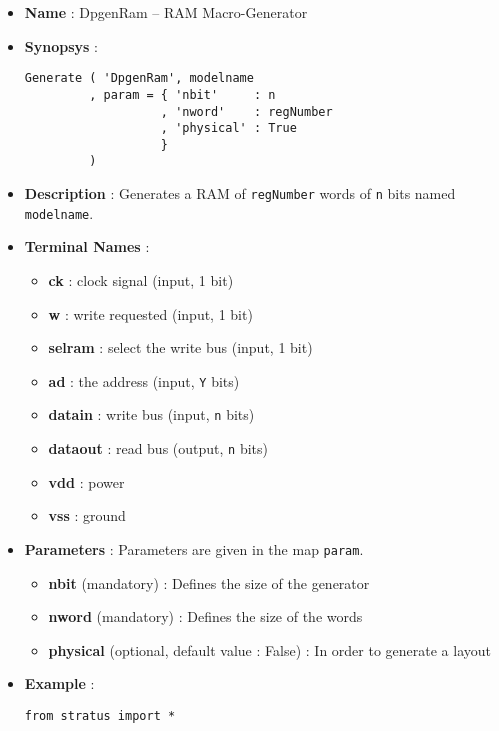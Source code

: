 \begin{itemize}
    \item \textbf{Name} : DpgenRam -- RAM Macro-Generator
    \item \textbf{Synopsys} :
\begin{verbatim}
Generate ( 'DpgenRam', modelname
         , param = { 'nbit'     : n
                   , 'nword'    : regNumber
                   , 'physical' : True                   
                   }
         )
\end{verbatim}
    \item \textbf{Description} : Generates a RAM of \verb-regNumber- words of \verb-n- bits named \verb-modelname-.
    \item \textbf{Terminal Names} :
    \begin{itemize}
        \item \textbf{ck} : clock signal (input, 1 bit)
        \item \textbf{w} : write requested (input, 1 bit)
        \item \textbf{selram} : select the write bus (input, 1 bit)
        \item \textbf{ad} : the address (input, \verb-Y- bits)
        \item \textbf{datain} : write bus (input, \verb-n- bits)
        \item \textbf{dataout} : read bus (output, \verb-n- bits)
        \item \textbf{vdd} : power
        \item \textbf{vss} : ground
    \end{itemize}
    \item \textbf{Parameters} : Parameters are given in the map \verb-param-.
    \begin{itemize}
        \item \textbf{nbit} (mandatory) : Defines the size of the generator
        \item \textbf{nword} (mandatory) : Defines the size of the words
        \item \textbf{physical} (optional, default value : False) : In order to generate a layout        
    \end{itemize}
    \item \textbf{Example} :
\begin{verbatim}
from stratus import *


\end{verbatim}
\end{itemize}
